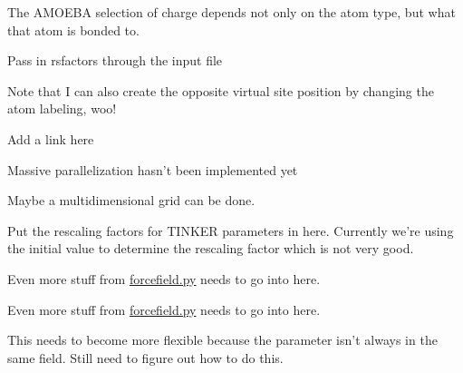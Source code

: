 \begin{DoxyRefList}
\-The \-A\-M\-O\-E\-B\-A selection of charge depends not only on the atom type, but what that atom is bonded to.  
\item[\label{todo__todo000007}%
\hypertarget{todo__todo000007}{}%
\-Member \hyperlink{classforcebalance_1_1forcefield_1_1FF_a88715f96ff8e14c3c83b4f976ad147b4}{forcebalance.forcefield.\-F\-F.rsmake} ]\-Pass in rsfactors through the input file 
\item[\label{todo__todo000011}%
\hypertarget{todo__todo000011}{}%
\-Class \hyperlink{classforcebalance_1_1gmxio_1_1ITP__Reader}{forcebalance.gmxio.\-I\-T\-P\-\_\-\-Reader} ]\-Note that \-I can also create the opposite virtual site position by changing the atom labeling, woo! 
\item[\label{todo__todo000014}%
\hypertarget{todo__todo000014}{}%
\-Member \hyperlink{classforcebalance_1_1openmmio_1_1OpenMM__Reader_ac89322d09d53425b5151f39306f4b38b}{forcebalance.openmmio.\-Open\-M\-M\-\_\-\-Reader.build\-\_\-pid} ]\-Add a link here  
\item[\label{todo__todo000015}%
\hypertarget{todo__todo000015}{}%
\-Member \hyperlink{classforcebalance_1_1optimizer_1_1Optimizer_a50ffc779fbba5a99085cba45d868fc29}{forcebalance.optimizer.\-Optimizer.\-Genetic\-Algorithm} ]\-Massive parallelization hasn't been implemented yet 
\item[\label{todo__todo000016}%
\hypertarget{todo__todo000016}{}%
\-Member \hyperlink{classforcebalance_1_1optimizer_1_1Optimizer_a6c7508252398ff7e00469c4c8acb0a48}{forcebalance.optimizer.\-Optimizer.\-Scan\-\_\-\-Values} ]\-Maybe a multidimensional grid can be done.  
\item[\label{todo__todo000018}%
\hypertarget{todo__todo000018}{}%
\-Member \hyperlink{classforcebalance_1_1tinkerio_1_1Tinker__Reader_a78df181e8a2ffea7054b1915e47384b7}{forcebalance.tinkerio.\-Tinker\-\_\-\-Reader.feed} ]\-Put the rescaling factors for \-T\-I\-N\-K\-E\-R parameters in here. \-Currently we're using the initial value to determine the rescaling factor which is not very good. 
\item[\label{todo__todo000009}%
\hypertarget{todo__todo000009}{}%
\-Namespace \hyperlink{namespaceforcebalance_1_1gmxio}{forcebalance\-:\-:gmxio} ]\-Even more stuff from \hyperlink{forcefield_8py}{forcefield.\-py} needs to go into here.

\-Even more stuff from \hyperlink{forcefield_8py}{forcefield.\-py} needs to go into here. 
\item[\label{todo__todo000010}%
\hypertarget{todo__todo000010}{}%
\-Member \hyperlink{namespaceforcebalance_1_1gmxio_afa3ee5e262ff005d87d20b4ec1581bad}{forcebalance\-:\-:gmxio.pdict} ]\-This needs to become more flexible because the parameter isn't always in the same field. \-Still need to figure out how to do this. 


\end{DoxyRefList}
